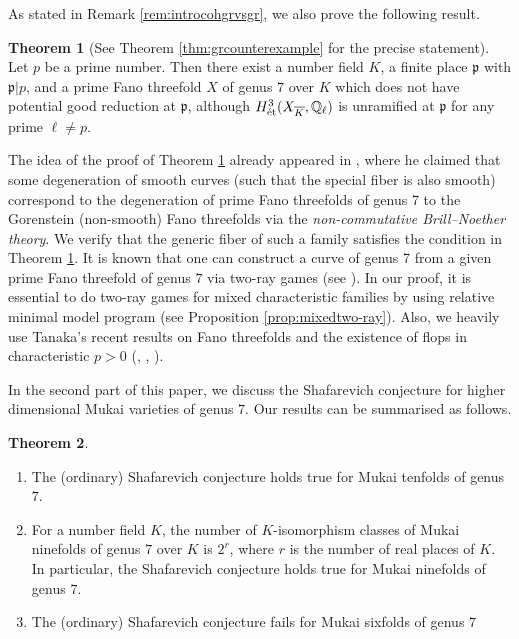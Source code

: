 \documentclass[autodetect-engine, a4paper]{amsart}
\theoremstyle{definition}
\newtheorem{thm}{Theorem}[section]
\def\p{{\mathfrak p}}
\def\Q{{\mathbb Q}}
\def\et{\mathop{\text{\rm \'et}}}
\begin{document}
As stated in Remark \ref{rem:introcohgrvsgr}, we also prove the following result.
\begin{thm}[See Theorem {\ref{thm:grcounterexample}} for the precise statement]
\label{thm:introgrcounterexample}
Let $p$ be a prime number.
Then there exist a number field $K$, a finite place $\p$ with $\p | p$, and a prime Fano threefold $X$ of genus $7$ over $K$ which does not have potential good reduction at $\p$, although $H^3_{\et}(X_{\overline{K}}, \Q_{\ell})$ is unramified at $\p$ for any prime $\ell \neq p$.
\end{thm}

The idea of the proof of Theorem \ref{thm:introgrcounterexample} already appeared in \cite[Section 8, (b)]{MukaiBrill}, where he claimed that some degeneration of smooth curves (such that the special fiber is also smooth) correspond to the degeneration of prime Fano threefolds of genus 7 to the Gorenstein (non-smooth) Fano threefolds via the {\it non-commutative Brill--Noether theory}.
We verify that the generic fiber of such a family satisfies the condition in Theorem \ref{thm:introgrcounterexample}.
It is known that one can construct a curve of genus 7 from a given prime Fano threefold of genus $7$ via two-ray games (see \cite[Section 8]{MukaiBrill}).
In our proof, it is essential to do two-ray games for mixed characteristic families by using relative minimal model program (see Proposition \ref{prop:mixedtwo-ray}).  
Also, we heavily use Tanaka's recent results on Fano threefolds and the existence of flops in characteristic $p>0$ (\cite{Tanaka1}, \cite{Tanaka2}, \cite{Tanakaflop}).

In the second part of this paper, we discuss the Shafarevich conjecture for higher dimensional Mukai varieties of genus $7$.
Our results can be summarised as follows.
\begin{thm}
\label{thm:introMukaifinite}
\begin{enumerate}
\item 
The (ordinary) Shafarevich conjecture holds true for Mukai tenfolds of genus $7$.
\item 
For a number field $K$, the number of $K$-isomorphism classes of Mukai ninefolds of genus $7$ over $K$ is $2^r$, where $r$ is the number of real places of $K$.
In particular, the Shafarevich conjecture holds true for Mukai ninefolds of genus $7$.
\item 
The (ordinary) Shafarevich conjecture fails for Mukai sixfolds of genus $7$
\end{enumerate}
\end{thm}
\end{document}
